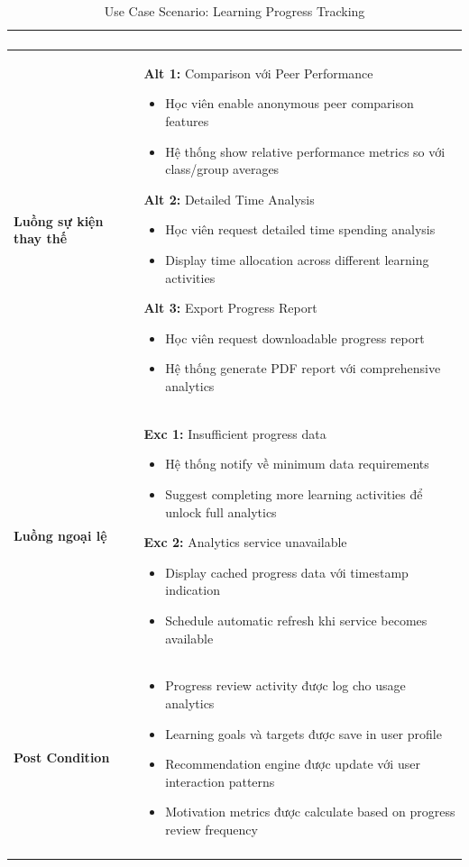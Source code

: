 \begin{longtable}{| p{3cm} | p{10cm} |}
\begin{enumerate}
\end{enumerate} \\ \hline
\textbf{Luồng sự kiện thay thế} & 
\textbf{Alt 1:} Comparison với Peer Performance
\begin{itemize}
    \item Học viên enable anonymous peer comparison features
    \item Hệ thống show relative performance metrics so với class/group averages
\end{itemize}
\textbf{Alt 2:} Detailed Time Analysis
\begin{itemize}
    \item Học viên request detailed time spending analysis
    \item Display time allocation across different learning activities
\end{itemize}
\textbf{Alt 3:} Export Progress Report
\begin{itemize}
    \item Học viên request downloadable progress report
    \item Hệ thống generate PDF report với comprehensive analytics
\end{itemize} \\ \hline
\textbf{Luồng ngoại lệ} & 
\textbf{Exc 1:} Insufficient progress data
\begin{itemize}
    \item Hệ thống notify về minimum data requirements
    \item Suggest completing more learning activities để unlock full analytics
\end{itemize}
\textbf{Exc 2:} Analytics service unavailable
\begin{itemize}
    \item Display cached progress data với timestamp indication
    \item Schedule automatic refresh khi service becomes available
\end{itemize} \\ \hline
\textbf{Post Condition} & 
\begin{itemize}
    \item Progress review activity được log cho usage analytics
    \item Learning goals và targets được save in user profile
    \item Recommendation engine được update với user interaction patterns
    \item Motivation metrics được calculate based on progress review frequency
\end{itemize} \\ \hline
\caption{Use Case Scenario: Learning Progress Tracking}
\label{tab:uc005} \\
\end{longtable}

